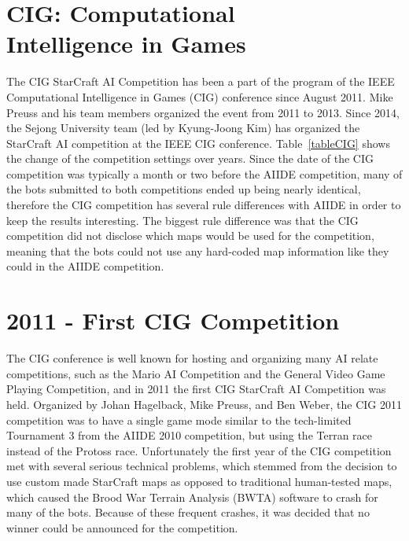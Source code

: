 \section{CIG: Computational\\ Intelligence in Games}\label{subsecCIG}

The CIG StarCraft AI Competition has been a part of the program of the IEEE Computational Intelligence in Games (CIG) conference since August 2011. Mike Preuss and his team members organized the event from 2011 to 2013. Since 2014, the Sejong University team (led by Kyung-Joong Kim) has organized the StarCraft AI competition at the IEEE CIG conference. Table~\ref{tableCIG} shows the change of the competition settings over years. Since the date of the CIG competition was typically a month or two before the AIIDE competition, many of the bots submitted to both competitions ended up being nearly identical, therefore the CIG competition has several rule differences with AIIDE in order to keep the results interesting. The biggest rule difference was that the CIG competition did not disclose which maps would be used for the competition, meaning that the bots could not use any hard-coded map information like they could in the AIIDE competition.

\section{2011 - First CIG Competition}
The CIG conference is well known for hosting and organizing many AI relate competitions, such as the Mario AI Competition and the General Video Game Playing Competition, and in 2011 the first CIG StarCraft AI Competition was held. Organized by Johan Hagelback, Mike Preuss, and Ben Weber, the CIG 2011 competition was to have a single game mode similar to the tech-limited Tournament 3 from the AIIDE 2010 competition, but using the Terran race instead of the Protoss race. Unfortunately the first year of the CIG competition met with several serious technical problems, which stemmed from the decision to use custom made StarCraft maps as opposed to traditional human-tested maps, which caused the Brood War Terrain Analysis (BWTA) software to crash for many of the bots. Because of these frequent crashes, it was decided that no winner could be announced for the competition. 


